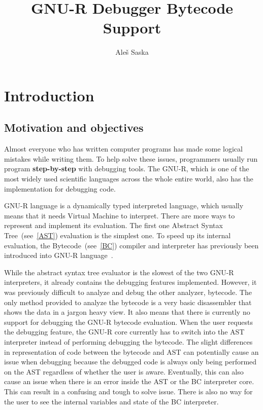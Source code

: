 \documentclass[thesis=M,english]{FITthesis}[2018/10/20]
\title{GNU-R Debugger Bytecode Support}
\author{Ale{\v s} Saska} %
\begin{document}


\chapter{Introduction}\label{introduction}

\section{Motivation and objectives}\label{motivation-and-objectives}

Almost everyone who has written computer programs has made some logical mistakes while writing them. To help solve these issues, programmers usually run program \textbf{step-by-step} with debugging tools. The \mbox{GNU-R}, which is one of the most widely used scientific languages across the whole entire world, also has the implementation for debugging code.

GNU-R language is a dynamically typed interpreted language, which usually means that it needs Virtual Machine to interpret. There are more ways to represent and implement its evaluation. The first one Abstract Syntax Tree~(see~\ref{AST}) evaluation is the simplest one. To speed up its internal evaluation, the Bytecode~(see~\ref{BC}) compiler and interpreter has previously been introduced into \mbox{GNU-R} language~\cite{r-compiler-some-first-experiments}.

While the abstract syntax tree evaluator is the slowest of the two GNU-R interpreters, it already contains the debugging features implemented. However, it was previously difficult to analyze and debug the other analyzer, bytecode. The only method provided to analyze the bytecode is a very basic disassembler that shows the data in a jargon heavy view. It also means that there is currently no support for debugging the GNU-R bytecode evaluation. When the user requests the debugging feature, the GNU-R core currently has to switch into the AST interpreter instead of performing debugging the bytecode. The slight differences in representation of code between the bytecode and AST can potentially cause an issue when debugging because the debugged code is always only being performed on the AST regardless of whether the user is aware. Eventually, this can also cause an issue when there is an error inside the AST or the BC interpreter core. This can result in a confusing and tough to solve issue. There is also no way for the user to see the internal variables and state of the BC interpreter.
\end{document}
